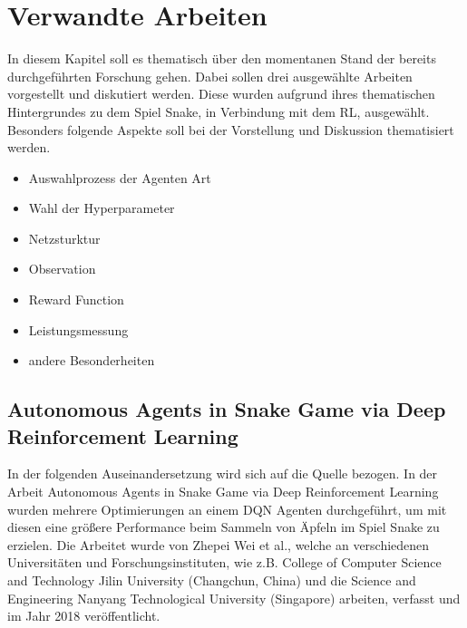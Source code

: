 \chapter{Verwandte Arbeiten} \label{chap:Verwandte_Arbeiten}
In diesem Kapitel soll es thematisch über den momentanen Stand der bereits durchgeführten Forschung gehen. Dabei sollen drei ausgewählte Arbeiten vorgestellt und diskutiert werden. Diese wurden aufgrund ihres thematischen Hintergrundes zu dem Spiel Snake, in Verbindung mit dem RL, ausgewählt.\\
Besonders folgende Aspekte soll bei der Vorstellung und Diskussion thematisiert werden.
\begin{itemize}
	\item Auswahlprozess der Agenten Art
	\item Wahl der Hyperparameter
	\item Netzsturktur
	\item Observation
	\item Reward Function
	\item Leistungsmessung
	\item andere Besonderheiten
\end{itemize}

\section{Autonomous Agents in Snake Game via Deep Reinforcement Learning} \label{sec:Paper_1}
In der folgenden Auseinandersetzung wird sich auf die Quelle \cite{Autonomous_Agents_in_Snake_Game_via_DRL} bezogen.
In der Arbeit Autonomous Agents in Snake Game via Deep Reinforcement Learning wurden mehrere Optimierungen an einem DQN Agenten durchgeführt, um mit diesen eine größere Performance beim Sammeln von Äpfeln im Spiel Snake zu erzielen. Die Arbeitet wurde von Zhepei Wei et al., welche an verschiedenen Universitäten und Forschungsinstituten, wie z.B. College of Computer Science and Technology Jilin University (Changchun, China) und die Science and Engineering Nanyang Technological University (Singapore) arbeiten, verfasst und im Jahr 2018 veröffentlicht.

